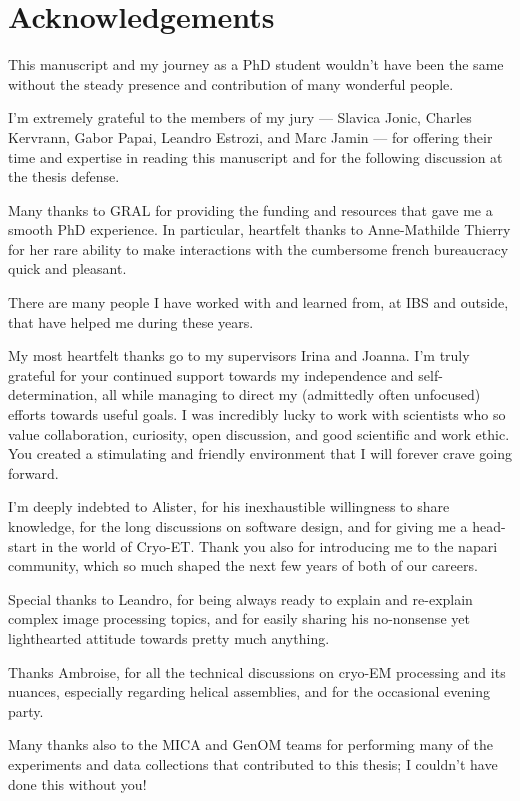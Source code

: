 \chapter{Acknowledgements}

This manuscript and my journey as a PhD student wouldn't have been the same without the steady presence and contribution of many wonderful people.

\bigskip

I'm extremely grateful to the members of my jury --- Slavica Jonic, Charles Kervrann, Gabor Papai, Leandro Estrozi, and Marc Jamin --- for offering their time and expertise in reading this manuscript and for the following discussion at the thesis defense.

Many thanks to GRAL for providing the funding and resources that gave me a smooth PhD experience. In particular, heartfelt thanks to Anne-Mathilde Thierry for her rare ability to make interactions with the cumbersome french bureaucracy quick and pleasant.

\bigskip

There are many people I have worked with and learned from, at IBS and outside, that have helped me during these years.

My most heartfelt thanks go to my supervisors Irina and Joanna. I'm truly grateful for your continued support towards my independence and self-determination, all while managing to direct my (admittedly often unfocused) efforts towards useful goals. I was incredibly lucky to work with scientists who so value collaboration, curiosity, open discussion, and good scientific and work ethic. You created a stimulating and friendly environment that I will forever crave going forward.

I'm deeply indebted to Alister, for his inexhaustible willingness to share knowledge, for the long discussions on software design, and for giving me a head-start in the world of Cryo-ET. Thank you also for introducing me to the napari community, which so much shaped the next few years of both of our careers. 

Special thanks to Leandro, for being always ready to explain and re-explain complex image processing topics, and for easily sharing his no-nonsense yet lighthearted attitude towards pretty much anything.

Thanks Ambroise, for all the technical discussions on cryo-EM processing and its nuances, especially regarding helical assemblies, and for the occasional evening party.

Many thanks also to the MICA and GenOM teams for performing many of the experiments and data collections that contributed to this thesis; I couldn't have done this without you!


